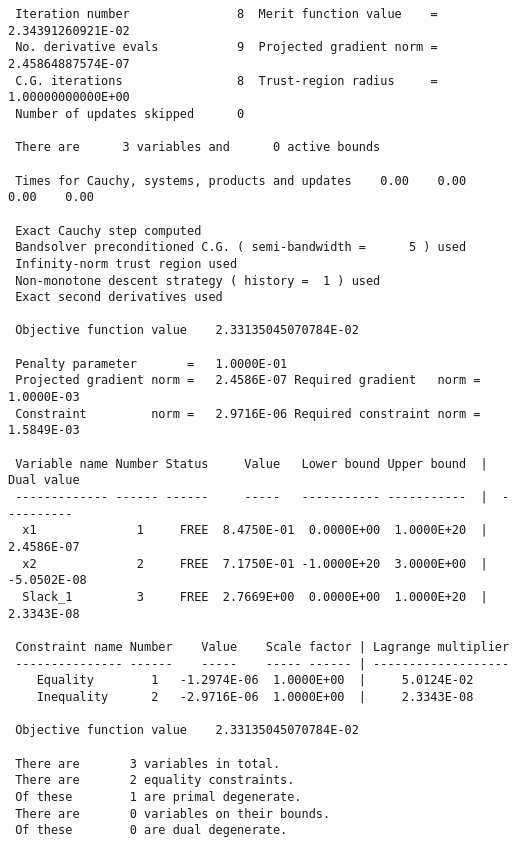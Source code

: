 \documentclass{article}
\begin{document}
{{\begin{verbatim}
 Iteration number               8  Merit function value    =   2.34391260921E-02
 No. derivative evals           9  Projected gradient norm =   2.45864887574E-07
 C.G. iterations                8  Trust-region radius     =   1.00000000000E+00
 Number of updates skipped      0

 There are      3 variables and      0 active bounds

 Times for Cauchy, systems, products and updates    0.00    0.00    0.00    0.00

 Exact Cauchy step computed
 Bandsolver preconditioned C.G. ( semi-bandwidth =      5 ) used
 Infinity-norm trust region used
 Non-monotone descent strategy ( history =  1 ) used
 Exact second derivatives used

 Objective function value    2.33135045070784E-02

 Penalty parameter       =   1.0000E-01
 Projected gradient norm =   2.4586E-07 Required gradient   norm =   1.0000E-03
 Constraint         norm =   2.9716E-06 Required constraint norm =   1.5849E-03

 Variable name Number Status     Value   Lower bound Upper bound  |  Dual value
 ------------- ------ ------     -----   ----------- -----------  |  ----------
  x1              1     FREE  8.4750E-01  0.0000E+00  1.0000E+20  |  2.4586E-07
  x2              2     FREE  7.1750E-01 -1.0000E+20  3.0000E+00  | -5.0502E-08
  Slack_1         3     FREE  2.7669E+00  0.0000E+00  1.0000E+20  |  2.3343E-08

 Constraint name Number    Value    Scale factor | Lagrange multiplier
 --------------- ------    -----    ----- ------ | -------------------
    Equality        1   -1.2974E-06  1.0000E+00  |     5.0124E-02
    Inequality      2   -2.9716E-06  1.0000E+00  |     2.3343E-08

 Objective function value    2.33135045070784E-02

 There are       3 variables in total.
 There are       2 equality constraints.
 Of these        1 are primal degenerate.
 There are       0 variables on their bounds.
 Of these        0 are dual degenerate.
\end{verbatim} }\def\baselinestretch{1.0}\noindent
}
\end{document}
